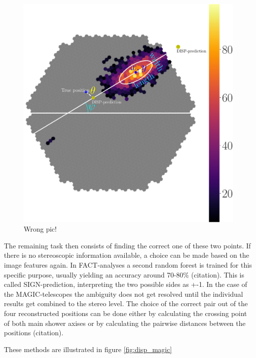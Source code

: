 \begin{figure}
    \includegraphics[width=0.9\linewidth]{../Plots/hillas_complete.pdf}
    \caption{Wrong pic!}
    \label{fig:disp_amb}
\end{figure}


The remaining task then consists of finding the correct one of these
two points. If there is no stereoscopic information available,
a choice can be made based on the image features again.
In FACT-analyses a second random forest is trained for this
specific purpose, usually yielding an accuracy around 70-80\% (citation).
This is called SIGN-prediction, interpreting the two possible sides
as +-1.
In the case of the MAGIC-telescopes the ambiguity does not
get resolved until the individual results get combined
to the stereo level. The choice of the correct
pair out of the four reconstructed positions can be done either
by calculating the crossing point of both main shower axises
or by calculating the pairwise distances between the positions (citation).


These methods are illustrated in figure \ref{fig:disp_magic}


